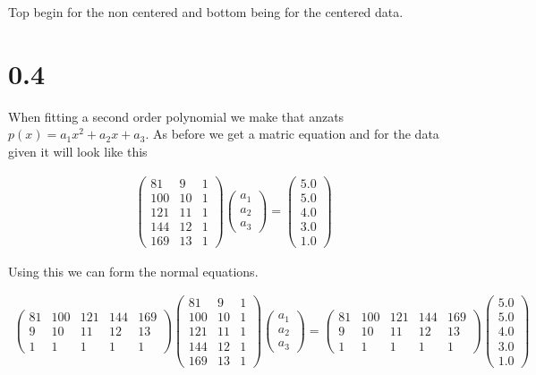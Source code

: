 \documentclass[a4paper]{article}
\begin{document}
Top begin for the non centered and bottom being for the centered data.

\section*{0.4}
When fitting a second order polynomial we make that anzats $p(x) = a_1x^2 + a_2x + a_3$. As before we get a matric equation and for the data given it will look like this

\begin{align*}
   \begin{pmatrix}
        81 & 9 & 1\\
        100 & 10 & 1\\
        121 & 11 & 1\\
        144 & 12 & 1\\
        169 & 13 & 1
    \end{pmatrix} \begin{pmatrix} a_1 \\ a_2 \\ a_3 \end{pmatrix} = \begin{pmatrix} 5.0 \\ 5.0 \\ 4.0 \\ 3.0 \\ 1.0 \end{pmatrix}
\end{align*}

Using this we can form the normal equations.

\begin{align*}
    \begin{pmatrix}
        81 & 100 & 121 & 144 & 169\\
        9 & 10 & 11 & 12 & 13\\
        1 & 1 & 1 & 1 & 1
    \end{pmatrix} \begin{pmatrix}
        81 & 9 & 1\\
        100 & 10 & 1\\
        121 & 11 & 1\\
        144 & 12 & 1\\
        169 & 13 & 1
    \end{pmatrix} \begin{pmatrix} a_1 \\ a_2 \\ a_3 \end{pmatrix} = \begin{pmatrix}
        81 & 100 & 121 & 144 & 169\\
        9 & 10 & 11 & 12 & 13\\
        1 & 1 & 1 & 1 & 1
    \end{pmatrix} \begin{pmatrix} 5.0 \\ 5.0 \\ 4.0 \\ 3.0 \\ 1.0 \end{pmatrix}
\end{align*}
\end{document}
